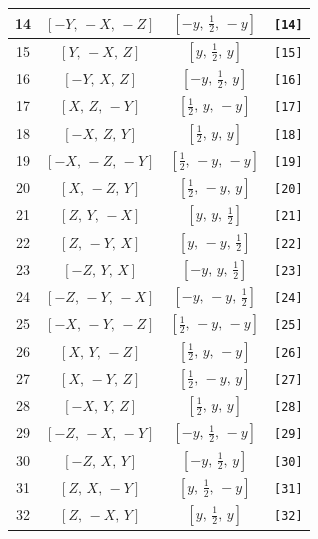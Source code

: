 \documentclass[fleqn,8pt]{jsarticle}
\begin{document}
\begin{longtable}{cccc}
14 & $\left[ - Y,\, - X,\, - Z \right]$ & $\left[ - y,\, \frac{1}{2},\, - y \right]$ & {\tt [14]} \\ \hline
15 & $\left[ Y,\, - X,\, Z \right]$ & $\left[ y,\, \frac{1}{2},\, y \right]$ & {\tt [15]} \\ \hline
16 & $\left[ - Y,\, X,\, Z \right]$ & $\left[ - y,\, \frac{1}{2},\, y \right]$ & {\tt [16]} \\ \hline
17 & $\left[ X,\, Z,\, - Y \right]$ & $\left[ \frac{1}{2},\, y,\, - y \right]$ & {\tt [17]} \\ \hline
18 & $\left[ - X,\, Z,\, Y \right]$ & $\left[ \frac{1}{2},\, y,\, y \right]$ & {\tt [18]} \\ \hline
19 & $\left[ - X,\, - Z,\, - Y \right]$ & $\left[ \frac{1}{2},\, - y,\, - y \right]$ & {\tt [19]} \\ \hline
20 & $\left[ X,\, - Z,\, Y \right]$ & $\left[ \frac{1}{2},\, - y,\, y \right]$ & {\tt [20]} \\ \hline
21 & $\left[ Z,\, Y,\, - X \right]$ & $\left[ y,\, y,\, \frac{1}{2} \right]$ & {\tt [21]} \\ \hline
22 & $\left[ Z,\, - Y,\, X \right]$ & $\left[ y,\, - y,\, \frac{1}{2} \right]$ & {\tt [22]} \\ \hline
23 & $\left[ - Z,\, Y,\, X \right]$ & $\left[ - y,\, y,\, \frac{1}{2} \right]$ & {\tt [23]} \\ \hline
24 & $\left[ - Z,\, - Y,\, - X \right]$ & $\left[ - y,\, - y,\, \frac{1}{2} \right]$ & {\tt [24]} \\ \hline
25 & $\left[ - X,\, - Y,\, - Z \right]$ & $\left[ \frac{1}{2},\, - y,\, - y \right]$ & {\tt [25]} \\ \hline
26 & $\left[ X,\, Y,\, - Z \right]$ & $\left[ \frac{1}{2},\, y,\, - y \right]$ & {\tt [26]} \\ \hline
27 & $\left[ X,\, - Y,\, Z \right]$ & $\left[ \frac{1}{2},\, - y,\, y \right]$ & {\tt [27]} \\ \hline
28 & $\left[ - X,\, Y,\, Z \right]$ & $\left[ \frac{1}{2},\, y,\, y \right]$ & {\tt [28]} \\ \hline
29 & $\left[ - Z,\, - X,\, - Y \right]$ & $\left[ - y,\, \frac{1}{2},\, - y \right]$ & {\tt [29]} \\ \hline
30 & $\left[ - Z,\, X,\, Y \right]$ & $\left[ - y,\, \frac{1}{2},\, y \right]$ & {\tt [30]} \\ \hline
31 & $\left[ Z,\, X,\, - Y \right]$ & $\left[ y,\, \frac{1}{2},\, - y \right]$ & {\tt [31]} \\ \hline
32 & $\left[ Z,\, - X,\, Y \right]$ & $\left[ y,\, \frac{1}{2},\, y \right]$ & {\tt [32]} \\ \hline

\end{longtable}
\end{document}
